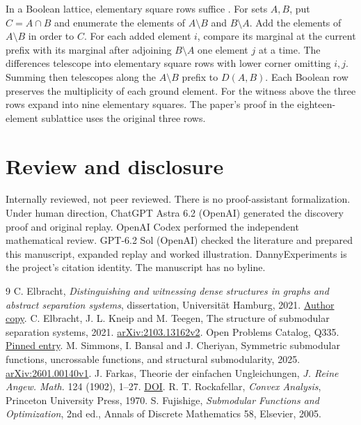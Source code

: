 \documentclass[11pt,a4paper]{amsart}
\begin{document}
In a Boolean lattice, elementary square rows suffice
\cite{fujishige}. For sets $A,B$, put $C=A\cap B$ and enumerate
the elements of $A\setminus B$ and $B\setminus A$. Add the
elements of $A\setminus B$ in order to $C$. For each added
element $i$, compare its marginal at the current prefix
with its marginal after adjoining $B\setminus A$ one
element $j$ at a time. The differences telescope into
elementary square rows with lower corner omitting $i,j$.
Summing then telescopes along the $A\setminus B$ prefix to
$D(A,B)$. Each Boolean row preserves the multiplicity of each
ground element. For the witness above the three rows expand
into nine elementary squares. The paper's proof in the
eighteen-element sublattice uses the original three rows.

\newpage
\section*{Review and disclosure}
Internally reviewed, not peer reviewed. There is no proof-assistant
formalization. Under human direction, ChatGPT Astra 6.2 (OpenAI)
generated the discovery proof and original replay. OpenAI Codex
performed the independent mathematical review. GPT-6.2 Sol (OpenAI)
checked the literature and prepared this manuscript, expanded replay
and worked illustration. DannyExperiments is the project's citation
identity. The manuscript has no byline.

\begin{thebibliography}{9}
C. Elbracht, \emph{Distinguishing and witnessing dense structures in
graphs and abstract separation systems}, dissertation, Universit\"at
Hamburg, 2021.
\href{https://www.math.uni-hamburg.de/spag/dm/papers/Dissertation_Christian_Elbracht.pdf}{Author copy}.
C. Elbracht, J. L. Kneip and M. Teegen, The structure of submodular
separation systems, 2021.
\href{https://arxiv.org/abs/2103.13162v2}{arXiv:2103.13162v2}.
Open Problems Catalog, Q335.
\href{https://github.com/10m-u/open-problems-catalog/blob/ca8d4d44ba3db527f19f28928c240168f545ecfe/problems/mathematics/combinatorics-graph-theory-part-1.md\#q335}{Pinned entry}.
M. Simmons, I. Bansal and J. Cheriyan, Symmetric submodular functions,
uncrossable functions, and structural submodularity, 2025.
\href{https://arxiv.org/abs/2601.00140v1}{arXiv:2601.00140v1}.
J. Farkas, Theorie der einfachen Ungleichungen,
\emph{J. Reine Angew. Math.} 124 (1902), 1--27.
\href{https://doi.org/10.1515/crll.1902.124.1}{DOI}.
R. T. Rockafellar, \emph{Convex Analysis},
Princeton University Press, 1970.
S. Fujishige, \emph{Submodular Functions and Optimization}, 2nd ed.,
Annals of Discrete Mathematics 58, Elsevier, 2005.
\end{thebibliography}
\end{document}
